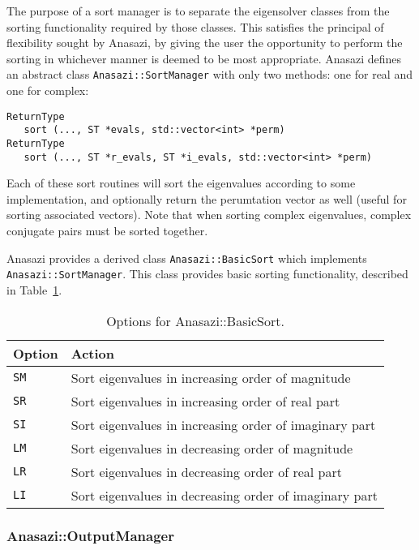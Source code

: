 The purpose of a sort manager is to separate the eigensolver classes from the
sorting functionality required by those classes. This satisfies the principal of
flexibility sought by Anasazi, by giving the user the opportunity to perform the
sorting in whichever manner is deemed to be most appropriate. Anasazi defines
an abstract class \verb!Anasazi::SortManager! with only two methods: one for
real and one for complex:
\begin{verbatim}
ReturnType  
   sort (..., ST *evals, std::vector<int> *perm) 
ReturnType 
   sort (..., ST *r_evals, ST *i_evals, std::vector<int> *perm)
\end{verbatim}
Each of these sort routines will sort the eigenvalues according to some
implementation, and optionally return the perumtation vector as well (useful for
sorting associated vectors). Note that when sorting complex eigenvalues, complex
conjugate pairs must be sorted together.

Anasazi provides a derived class \verb!Anasazi::BasicSort! which implements
\verb!Anasazi::SortManager!. This class provides basic sorting functionality,
described in Table~\ref{tab:anasazi:sm}.

\begin{table}
\begin{center}
\begin{tabular}{| p{2cm} l |}
\hline
Option & Action \\
\hline
{\tt SM} & Sort eigenvalues in increasing order of magnitude \\
{\tt SR} & Sort eigenvalues in increasing order of real part \\
{\tt SI} & Sort eigenvalues in increasing order of imaginary part \\
{\tt LM} & Sort eigenvalues in decreasing order of magnitude \\
{\tt LR} & Sort eigenvalues in decreasing order of real part \\
{\tt LI} & Sort eigenvalues in decreasing order of imaginary part \\
\hline
\end{tabular}
\caption{Options for Anasazi::BasicSort.}
\label{tab:anasazi:sm}
\end{center}
\end{table}


\subsubsection{Anasazi::OutputManager}
\label{sec:anasazi:om}

